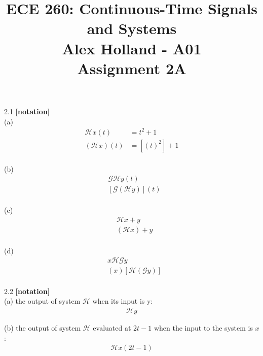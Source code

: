 \documentclass{article}
\title{%
   ECE 260: Continuous-Time Signals and Systems\\
    \Large Alex Holland - A01\\
    Assignment 2A\\
    }
\date{}
\begin{document}
\maketitle


2.1 {\bf [notation]}\\
(a)
\begin{equation*}
\begin{split}
    \mathcal{H}x(t) &= t^2 + 1\\
    (\mathcal{H}x)(t) &= [(t)^2] + 1\\
\end{split}
\end{equation*}

(b)
\begin{equation*}
\begin{split}
    & \mathcal{G} \mathcal{H} y (t) \\
    & [\mathcal{G}(\mathcal{H} y)](t)\\
\end{split}
\end{equation*}

(c)
\begin{equation*}
\begin{split}
    & \mathcal{H}x + y\\
    & (\mathcal{H}x) + y\\
\end{split}
\end{equation*}

(d)
\begin{equation*}
\begin{split}
    & x\mathcal{H} \mathcal{G}y\\
    & (x)[\mathcal{H} (\mathcal{G}y)]\\
\end{split}
\end{equation*}


2.2 {\bf [notation]}\\

(a)
the output of system $\mathcal{H}$ when its input is y:
\begin{equation*}
\begin{split}
    \mathcal{H}y
\end{split}
\end{equation*}

(b)
the output of system $\mathcal{H}$ evaluated at $2t - 1$ when the input to the system is $x$:
\begin{equation*}
\begin{split}
    \mathcal{H}x(2t - 1)
\end{split}
\end{equation*}
\end{document}
